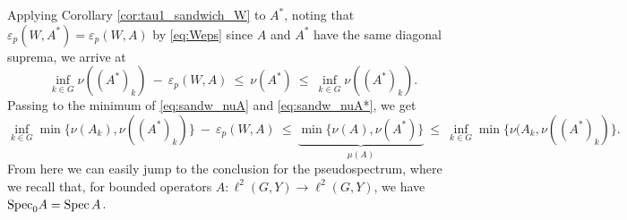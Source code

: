 \documentclass{article}
\newcommand\eps{{\varepsilon}}
\newcommand\Specn{{\rm Spec}}   %
\newcommand\Spec{{\rm Spec}\,}  %
\numberwithin{equation}{section}   %
\numberwithin{figure}{section}  %
\begin{document}
Applying Corollary \ref{cor:tau1_sandwich_W} to $A^*$, noting that $\eps_p(W,A^*)=\eps_p(W,A)$ by \eqref{eq:Weps} since $A$ and $A^*$ have the same diagonal suprema, we arrive at
%
\begin{equation} \label{eq:sandw_nuA*}
\inf_{k\in G}\nu((A^*)_k)\ -\ \eps_p(W,A)\ \le\ \nu(A^*)\ \le\ \inf_{k\in G}\nu((A^*)_k).
\end{equation}
Passing to the minimum of \eqref{eq:sandw_nuA} and \eqref{eq:sandw_nuA*}, we get
\begin{equation} \label{eq:sandw_nuAA*}
\inf_{k\in G}\min\{\nu(A_k),\nu((A^*)_k)\}\ -\ \eps_p(W,A)\ \le\ \underbrace{\min\{\nu(A),\nu(A^*)\}}_{\mu(A)}\ \le\ \inf_{k\in G}\min\{\nu(A_k,\nu((A^*)_k)\}.
\end{equation}
%
From here we can easily jump to the conclusion for the pseudospectrum, where we recall that, for bounded operators $A:\ell^2(G,Y)\to\ell^2(G,Y)$, we have $\Specn_0A=\Spec A$.
\end{document}
